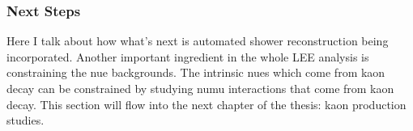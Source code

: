 \subsubsection{Next Steps}
Here I talk about how what's next is automated shower reconstruction being incorporated. Another important ingredient in the whole LEE analysis is constraining the nue backgrounds. The intrinsic nues which come from kaon decay can be constrained by studying numu interactions that come from kaon decay. This section will flow into the next chapter of the thesis: kaon production studies.

